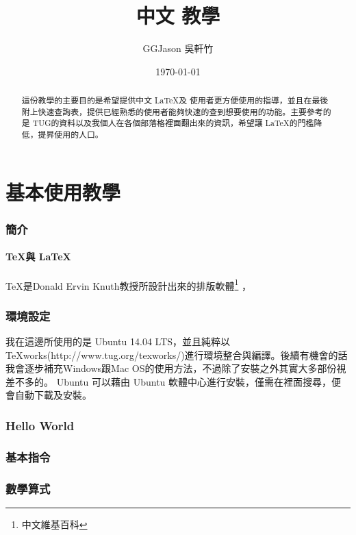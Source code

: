 \documentclass[12pt,a4paper]{article}
\title{中文 \XeLaTeX 教學}
\author{GGJason 吳軒竹}
\date{\today}
\begin{document}
	\maketitle
	\newpage
	\begin{abstract}
		這份教學的主要目的是希望提供中文 \LaTeX 及 \XeLaTeX 使用者更方便使用的指導，並且在最後附上快速查詢表，提供已經熟悉的使用者能夠快速的查到想要使用的功能。主要參考的是 TUG的資料以及我個人在各個部落格裡面翻出來的資訊，希望讓 \LaTeX 的門檻降低，提昇使用的人口。
	\end{abstract}
	\newpage
	\tableofcontents
	\newpage
	\part{ \XeLaTeX 基本使用教學}

		\section{ \XeLaTeX 簡介}
			\subsection{\TeX 與 \LaTeX}
				\TeX 是Donald Ervin Knuth教授所設計出來的排版軟體\footnote{中文維基百科} ，
			\subsection{\XeLaTeX}
		\section{ \XeLaTeX 環境設定}
			我在這邊所使用的是 Ubuntu 14.04 LTS，並且純粹以TeXworks(http://www.tug.org/texworks/)進行環境整合與編譯。後續有機會的話我會逐步補充Windows跟Mac OS的使用方法，不過除了安裝之外其實大多部份視差不多的。
			Ubuntu 可以藉由 Ubuntu 軟體中心進行安裝，僅需在裡面搜尋，便會自動下載及安裝。
		\section{ Hello World }


		\section{基本指令}

		\section{數學算式}
\end{document}
